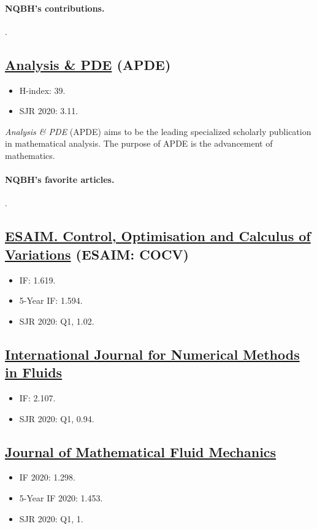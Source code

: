 \documentclass{article}
\numberwithin{equation}{section}
\begin{document}
\paragraph{NQBH's contributions.} \cite{Dao_Diaz_Nguyen2020}.

\subsection{\href{https://msp.org/apde}{Analysis \& PDE} (APDE)}
\begin{itemize}
	\item H-index: 39.
	\item SJR 2020: 3.11.
\end{itemize}
\textit{Analysis \& PDE} (APDE) aims to be the leading specialized scholarly publication in mathematical analysis. The purpose of APDE is the advancement of mathematics.

\paragraph{NQBH's favorite articles.} \cite{Tao2013}.

\subsection{\href{https://www.esaim-cocv.org/}{ESAIM. Control, Optimisation and Calculus of Variations} (ESAIM: COCV)}
\begin{itemize}
	\item IF: 1.619.
	\item 5-Year IF: 1.594.
	\item SJR 2020: Q1, 1.02.
\end{itemize}

\subsection{\href{https://onlinelibrary.wiley.com/journal/10970363}{International Journal for Numerical Methods in Fluids}}
\begin{itemize}
	\item IF: 2.107.
	\item SJR 2020: Q1, 0.94.
\end{itemize}

\subsection{\href{https://www.springer.com/journal/21}{Journal of Mathematical Fluid Mechanics}}
\begin{itemize}
	\item IF 2020: 1.298.
	\item 5-Year IF 2020: 1.453.
	\item SJR 2020: Q1, 1.
\end{itemize}
\end{document}
